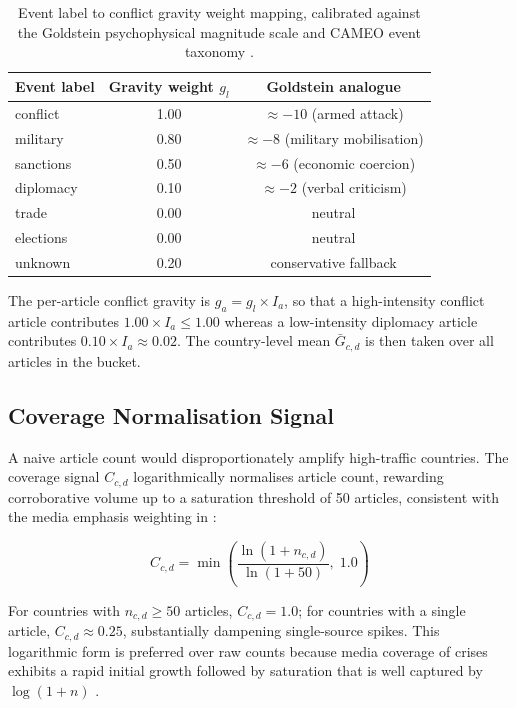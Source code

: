 \documentclass[12pt,a4paper]{report}
\begin{document}
\begin{table}[H]
\centering
\caption{Event label to conflict gravity weight mapping, calibrated
  against the Goldstein \cite{goldstein1992} psychophysical magnitude
  scale and CAMEO event taxonomy \cite{schrodt2012}.}
\label{tab:gravity}
\begin{tabular}{lcc}
\toprule
\textbf{Event label} & \textbf{Gravity weight} $g_l$ &
\textbf{Goldstein analogue} \\
\midrule
conflict   & 1.00 & $\approx -10$ (armed attack) \\
military   & 0.80 & $\approx -8$  (military mobilisation) \\
sanctions  & 0.50 & $\approx -6$  (economic coercion) \\
diplomacy  & 0.10 & $\approx -2$  (verbal criticism) \\
trade      & 0.00 & neutral \\
elections  & 0.00 & neutral \\
unknown    & 0.20 & conservative fallback \\
\bottomrule
\end{tabular}
\end{table}

The per-article conflict gravity is $g_a = g_l \times I_a$, so that a
high-intensity conflict article contributes $1.00 \times I_a \leq 1.00$
whereas a low-intensity diplomacy article contributes
$0.10 \times I_a \approx 0.02$. The country-level mean
$\bar{G}_{c,d}$ is then taken over all articles in the bucket.

\subsection{Coverage Normalisation Signal}
\label{sec:coverage}

A naive article count would disproportionately amplify high-traffic
countries. The coverage signal $C_{c,d}$ logarithmically normalises
article count, rewarding corroborative volume up to a saturation threshold
of 50 articles, consistent with the media emphasis weighting in
\cite{manela2017}:

\begin{equation}
  C_{c,d} = \min\!\left(\frac{\ln(1 + n_{c,d})}{\ln(1 + 50)},\; 1.0\right)
  \label{eq:coverage}
\end{equation}

For countries with $n_{c,d} \geq 50$ articles, $C_{c,d} = 1.0$; for
countries with a single article, $C_{c,d} \approx 0.25$, substantially
dampening single-source spikes. This logarithmic form is preferred over
raw counts because media coverage of crises exhibits a rapid initial
growth followed by saturation that is well captured by $\log(1 + n)$
\cite{manela2017, caldara2022}.
\end{document}
